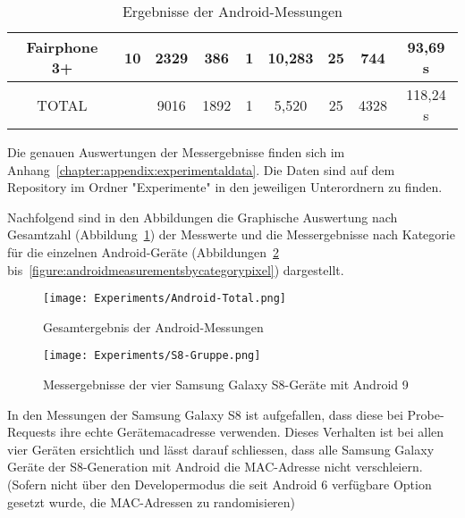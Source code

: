 \begin{landscape}
\begin{table}[h!]
\begin{tabular}{|c|c|c|c|c|c|c|c|c|}
            \hline
            Fairphone 3+ &  10 & 2329 & \phantom{0}386 & 1 & 10,283 & 25 & \phantom{0}744 & \phantom{0}93,69 s \\
            \hline
            TOTAL & & 9016 & 1892 & 1 & \phantom{0}5,520 & 25 & 4328 & 118,24 s \\
            \hline
        \end{tabular}
        \caption{Ergebnisse der Android-Messungen
        \label{table:androidproberesults}}  
    \end{table}
    Die genauen Auswertungen der Messergebnisse finden sich im 
    Anhang~\ref{chapter:appendix:experimentaldata}. 
    Die Daten sind auf dem Repository im Ordner "Experimente" in den jeweiligen Unterordnern
    zu finden.

    \clearpage

    Nachfolgend sind in den Abbildungen die Graphische Auswertung nach Gesamtzahl
    (Abbildung~\ref{figure:totalandroidmeasurements}) der Messwerte und die Messergebnisse nach Kategorie für
    die einzelnen Android-Geräte (Abbildungen~\ref{figure:androidmeasurementsbycategorys8}
    bis~\ref{figure:androidmeasurementsbycategorypixel}) dargestellt.

    \begin{figure}[h!]
        \centering
        \texttt{[image: Experiments/Android-Total.png]}
        \caption{Gesamtergebnis der Android-Messungen}
        \label{figure:totalandroidmeasurements}
    \end{figure}
\end{landscape}

\clearpage

\begin{figure}[h!]
    \centering
    \texttt{[image: Experiments/S8-Gruppe.png]}
    \caption{Messergebnisse der vier Samsung Galaxy S8-Geräte mit Android 9}
    \label{figure:androidmeasurementsbycategorys8}
\end{figure}

In den Messungen der Samsung Galaxy S8 ist aufgefallen, dass diese bei 
Probe-Requests ihre echte Gerätemacadresse verwenden. Dieses Verhalten ist bei 
allen vier Geräten ersichtlich und lässt darauf schliessen, dass alle Samsung 
Galaxy Geräte der S8-Generation mit Android die MAC-Adresse nicht verschleiern.
(Sofern nicht über den Developermodus die seit Android 6 verfügbare Option 
gesetzt wurde, die MAC-Adressen zu randomisieren)

\clearpage

